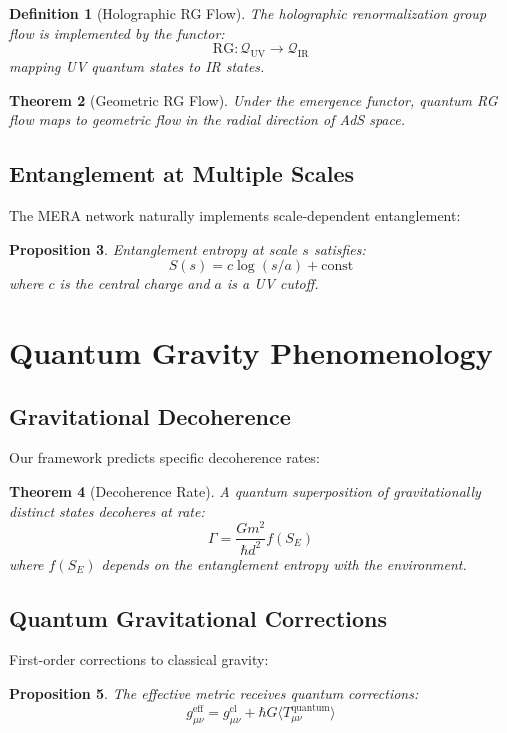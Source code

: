 \documentclass[11pt,a4paper]{article}
\newtheorem{theorem}{Theorem}[section]
\newtheorem{proposition}[theorem]{Proposition}
\newtheorem{definition}[theorem]{Definition}
\begin{document}
\begin{definition}[Holographic RG Flow]
The holographic renormalization group flow is implemented by the functor:
\[
\text{RG}: \mathcal{Q}_{\text{UV}} \to \mathcal{Q}_{\text{IR}}
\]
mapping UV quantum states to IR states.
\end{definition}

\begin{theorem}[Geometric RG Flow]
Under the emergence functor, quantum RG flow maps to geometric flow in the radial direction of AdS space.
\end{theorem}

\subsection{Entanglement at Multiple Scales}

The MERA network naturally implements scale-dependent entanglement:

\begin{proposition}
Entanglement entropy at scale $s$ satisfies:
\[
S(s) = c \log(s/a) + \text{const}
\]
where $c$ is the central charge and $a$ is a UV cutoff.
\end{proposition}

\section{Quantum Gravity Phenomenology}

\subsection{Gravitational Decoherence}

Our framework predicts specific decoherence rates:

\begin{theorem}[Decoherence Rate]
A quantum superposition of gravitationally distinct states decoheres at rate:
\[
\Gamma = \frac{G m^2}{\hbar d^2} f(S_E)
\]
where $f(S_E)$ depends on the entanglement entropy with the environment.
\end{theorem}

\subsection{Quantum Gravitational Corrections}

First-order corrections to classical gravity:

\begin{proposition}
The effective metric receives quantum corrections:
\[
g_{\mu\nu}^{\text{eff}} = g_{\mu\nu}^{\text{cl}} + \hbar G \langle T_{\mu\nu}^{\text{quantum}}\rangle
\]
\end{proposition}
\end{document}

